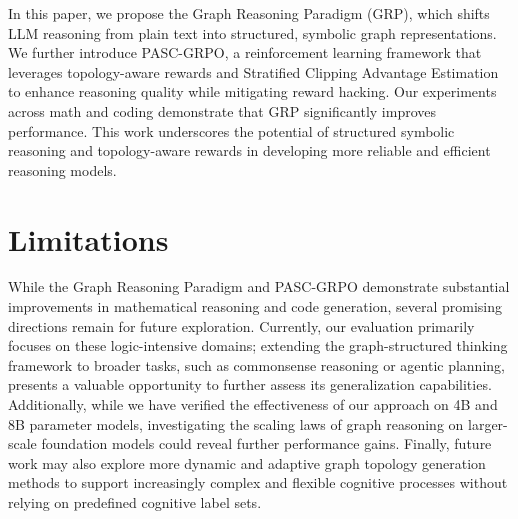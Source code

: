 \documentclass[11pt]{article}
\begin{document}
In this paper, we propose the Graph Reasoning Paradigm (GRP), which shifts LLM reasoning from plain text into structured, symbolic graph representations. We further introduce PASC-GRPO, a reinforcement learning framework that leverages topology-aware rewards and Stratified Clipping Advantage Estimation to enhance reasoning quality while mitigating reward hacking. Our experiments across math and coding demonstrate that GRP significantly improves performance. This work underscores the potential of structured symbolic reasoning and topology-aware rewards in developing more reliable and efficient reasoning models.


\section*{Limitations}

While the Graph Reasoning Paradigm and PASC-GRPO demonstrate substantial improvements in mathematical reasoning and code generation, several promising directions remain for future exploration. Currently, our evaluation primarily focuses on these logic-intensive domains; extending the graph-structured thinking framework to broader tasks, such as commonsense reasoning or agentic planning, presents a valuable opportunity to further assess its generalization capabilities. Additionally, while we have verified the effectiveness of our approach on 4B and 8B parameter models, investigating the scaling laws of graph reasoning on larger-scale foundation models could reveal further performance gains. Finally, future work may also explore more dynamic and adaptive graph topology generation methods to support increasingly complex and flexible cognitive processes without relying on predefined cognitive label sets.
 


\newpage
\appendix


\end{document}
